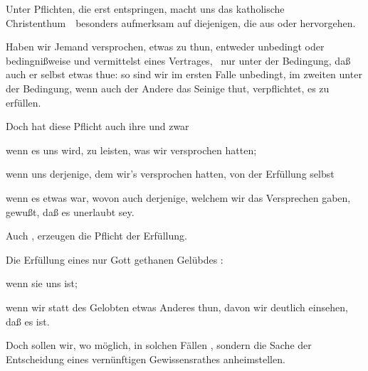 Unter Pflichten, die erst  entspringen, macht uns das katholische Christenthum~\ besonders aufmerksam auf diejenigen, die aus  oder  hervorgehen.
\begin{aufza}
\item Haben wir Jemand versprochen, etwas zu thun, entweder unbedingt oder bedingnißweise und vermittelst eines Vertrages, \dh\  nur unter der Bedingung, daß auch er selbst etwas thue: so sind wir im ersten Falle unbedingt, im zweiten unter der Bedingung, wenn auch der Andere das Seinige thut, verpflichtet, es zu erfüllen.
\item Doch hat diese Pflicht auch ihre  und zwar
\begin{aufzb}
\item wenn es uns  wird, zu leisten, was wir versprochen hatten;
\item wenn uns derjenige, dem wir's versprochen hatten, von der Erfüllung selbst 
\item wenn es etwas  war, wovon auch derjenige, welchem wir das Versprechen gaben, gewußt, daß es unerlaubt sey.
\end{aufzb}
\item Auch , erzeugen die Pflicht der Erfüllung.
\item Die Erfüllung eines nur Gott gethanen Gelübdes :
\begin{aufzb}
\item wenn sie uns  ist;
\item wenn wir statt des Gelobten etwas Anderes thun, davon wir deutlich einsehen, daß es  ist.
\end{aufzb}
\item Doch sollen wir, wo möglich, in solchen Fällen , sondern die Sache der Entscheidung eines vernünftigen Gewissensrathes anheimstellen.
\end{aufza}

